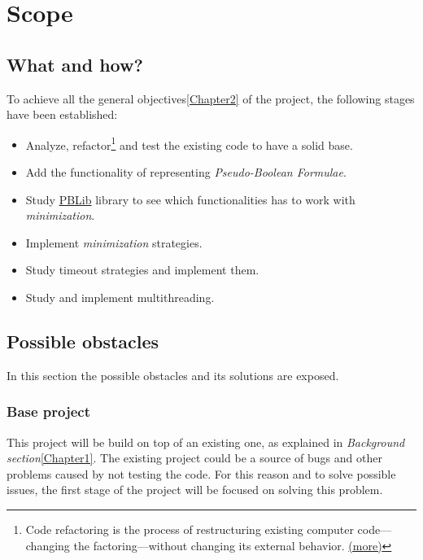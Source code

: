\chapter{Scope} %

\label{Chapter3} %

\section{What and how?}

To achieve all the general objectives\ref{Chapter2} of the project, the following stages have been established:
\begin{itemize}
	\item Analyze, refactor\footnote{Code refactoring is the process of restructuring existing computer code—changing the factoring—without changing its external behavior. \href{https://en.wikipedia.org/wiki/Code_refactoring}{(more)}} and test the existing code to have a solid base. 
	\item Add the functionality of representing \emph{Pseudo-Boolean Formulae}.
	\item Study \href{http://tools.computational-logic.org/content/pblib.php}{PBLib} library to see which functionalities has to work with \emph{minimization}.
	\item Implement \emph{minimization} strategies.
	\item Study timeout strategies and implement them.
	\item Study and implement multithreading.
\end{itemize}

\section{Possible obstacles}

In this section the possible obstacles and its solutions are exposed.

\subsection{Base project}
This project will be build on top of an existing one, as explained in \emph{Background section}\ref{Chapter1}. The existing project could be a source of bugs and other problems caused by not testing the code. For this reason and to solve possible issues, the first stage of the project will be focused on solving this problem.
